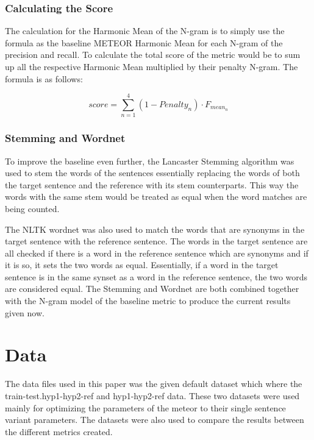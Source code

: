 \documentclass[11pt,letterpaper]{article}
\begin{document}
\subsubsection{Calculating the Score}

The calculation for the Harmonic Mean of the N-gram is to simply use the formula as the baseline METEOR Harmonic Mean for each N-gram of the precision and recall. To calculate the total score of the metric would be to sum up all the respective Harmonic Mean multiplied by their penalty N-gram. The formula is as follows:

\begin{equation*}
score = \sum_{n=1}^{4}(1-Penalty_{n})\cdot F_{mean_{n}}
\end{equation*}


\subsubsection{Stemming and Wordnet}

To improve the baseline even further, the Lancaster Stemming algorithm was used to stem the words of the sentences essentially replacing the words of both the target sentence and the reference with its stem counterparts. This way the words with the same stem would be treated as equal when the word matches are being counted.

The NLTK wordnet was also used to match the words that are synonyms in the target sentence with the reference sentence. The words in the target sentence are all checked if there is a word in the reference sentence which are synonyms and if it is so, it sets the two words as equal. Essentially, if a word in the target sentence is in the same synset as a word in the reference sentence, the two words are considered equal. The Stemming and Wordnet are both combined together with the N-gram model of the baseline metric to produce the current results given now.

\section{Data}

The data files used in this paper was the given default dataset which where the train-test.hyp1-hyp2-ref and hyp1-hyp2-ref data. These two datasets were used mainly for optimizing the parameters of the meteor to their single sentence variant parameters. The datasets were also used to compare the results between the different metrics created.
\end{document}
